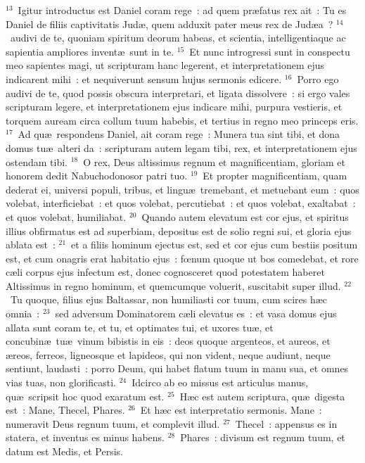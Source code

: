 ${}^{13}$~Igitur introductus est Daniel coram rege~: ad quem pr\ae fatus rex ait~: Tu es Daniel de filiis captivitatis Jud\ae , quem adduxit pater meus rex de Jud\ae a~?
${}^{14}$~audivi de te, quoniam spiritum deorum habeas, et scientia, intelligentiaque ac sapientia ampliores invent\ae\ sunt in te.
${}^{15}$~Et nunc introgressi sunt in conspectu meo sapientes magi, ut scripturam hanc legerent, et interpretationem ejus indicarent mihi~: et nequiverunt sensum hujus sermonis edicere.
${}^{16}$~Porro ego audivi de te, quod possis obscura interpretari, et ligata dissolvere~: si ergo vales scripturam legere, et interpretationem ejus indicare mihi, purpura vestieris, et torquem auream circa collum tuum habebis, et tertius in regno meo princeps eris.
${}^{17}$~Ad qu\ae\ respondens Daniel, ait coram rege~: Munera tua sint tibi, et dona domus tu\ae\ alteri da~: scripturam autem legam tibi, rex, et interpretationem ejus ostendam tibi.
${}^{18}$~O rex, Deus altissimus regnum et magnificentiam, gloriam et honorem dedit Nabuchodonosor patri tuo.
${}^{19}$~Et propter magnificentiam, quam dederat ei, universi populi, tribus, et lingu\ae\ tremebant, et metuebant eum~: quos volebat, interficiebat~: et quos volebat, percutiebat~: et quos volebat, exaltabat~: et quos volebat, humiliabat.
${}^{20}$~Quando autem elevatum est cor ejus, et spiritus illius obfirmatus est ad superbiam, depositus est de solio regni sui, et gloria ejus ablata est~:
${}^{21}$~et a filiis hominum ejectus est, sed et cor ejus cum bestiis positum est, et cum onagris erat habitatio ejus~: fœnum quoque ut bos comedebat, et rore c\ae li corpus ejus infectum est, donec cognosceret quod potestatem haberet Altissimus in regno hominum, et quemcumque voluerit, suscitabit super illud.
${}^{22}$~Tu quoque, filius ejus Baltassar, non humiliasti cor tuum, cum scires h\ae c omnia~:
${}^{23}$~sed adversum Dominatorem c\ae li elevatus es~: et vasa domus ejus allata sunt coram te, et tu, et optimates tui, et uxores tu\ae , et concubin\ae\ tu\ae\ vinum bibistis in eis~: deos quoque argenteos, et aureos, et \ae reos, ferreos, ligneosque et lapideos, qui non vident, neque audiunt, neque sentiunt, laudasti~: porro Deum, qui habet flatum tuum in manu sua, et omnes vias tuas, non glorificasti.
${}^{24}$~Idcirco ab eo missus est articulus manus, qu\ae\ scripsit hoc quod exaratum est.
${}^{25}$~H\ae c est autem scriptura, qu\ae\ digesta est~: Mane, Thecel, Phares.
${}^{26}$~Et h\ae c est interpretatio sermonis. Mane~: numeravit Deus regnum tuum, et complevit illud.
${}^{27}$~Thecel~: appensus es in statera, et inventus es minus habens.
${}^{28}$~Phares~: divisum est regnum tuum, et datum est Medis, et Persis.


